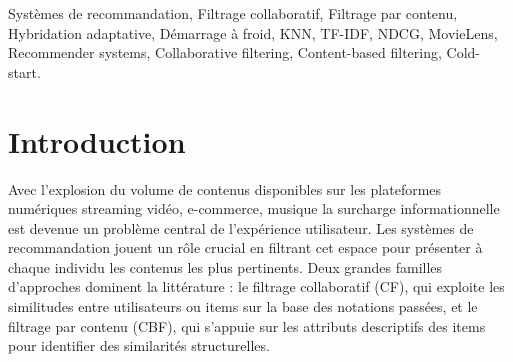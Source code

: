 \documentclass[conference]{IEEEtran}
\begin{document}
\begin{abstract}
	\vspace{0.8em}
	\noindent\textit{\textbf{Abstract}---}Collaborative filtering recommendation systems suffer from the cold-start problem: they are unable to produce relevant suggestions for users with little to no rating history. Conversely, Content-Based Filtering (CBF) approaches struggle to capture the latent preferences of active users. Neither of these two families, taken in isolation, constitutes a universal solution. This gap motivates the exploration of hybrid methods capable of combining their respective strengths. We propose AdaptiveHybrid, an adaptive hybrid system combining an enriched K-Nearest Neighbors Collaborative Filtering (KNN-CF) module and an enhanced content module (SmartCBF) integrating TF-IDF genre weighting, demographic fallback, and popularity priors. The weighting between the two components (parameter $\alpha$) is learned through cross-validation, and a cold-start correction mechanism dynamically adjusts $\alpha$ based on user activity. The experimental protocol includes 5 independent runs, three complementary metrics (RMSE, NDCG@10, Recall@10), and two benchmark datasets: MovieLens 100K and MovieLens 1M. Results show that AdaptiveHybrid outperforms Popularity-based baselines on RMSE and surpasses SVD on ranking metrics (NDCG@10 and Recall@10) on ML-1M, while offering superior cold-start management through the SmartCBF fallback. These results confirm our two primary hypotheses: (H1) the CF+CBF combination outperforms each individual component, and (H2) this adaptive combination significantly mitigates the cold-start problem.
\end{abstract}

\begin{IEEEkeywords}
	Systèmes de recommandation, Filtrage collaboratif, Filtrage par contenu, Hybridation adaptative, Démarrage à froid, KNN, TF-IDF, NDCG, MovieLens, Recommender systems, Collaborative filtering, Content-based filtering, Cold-start.
\end{IEEEkeywords}

\section{Introduction}
\label{sec:intro}

Avec l'explosion du volume de contenus disponibles sur les plateformes
numériques streaming vidéo, e-commerce, musique la surcharge
informationnelle est devenue un problème central de l'expérience utilisateur.
Les systèmes de recommandation jouent un rôle crucial en filtrant cet espace
pour présenter à chaque individu les contenus les plus pertinents. Deux
grandes familles d'approches dominent la littérature : le filtrage collaboratif
(CF), qui exploite les similitudes entre utilisateurs ou items sur la base
des notations passées, et le filtrage par contenu (CBF), qui s'appuie sur
les attributs descriptifs des items pour identifier des similarités
structurelles.
\end{document}
